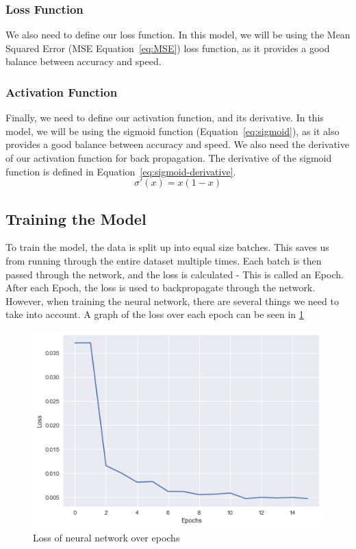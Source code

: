 \documentclass[titlepage]{article}
\begin{document}
\subsubsection{Loss Function}
We also need to define our loss function. In this model, we will be using the Mean Squared Error (MSE Equation~\ref{eq:MSE}) loss function, as it provides a good balance between accuracy and speed.
\subsubsection{Activation Function}
Finally, we need to define our activation function, and its derivative. In this model, we will be using the sigmoid function (Equation~\ref{eq:sigmoid}), as it also provides a good balance between accuracy and speed. We also need the derivative of our activation function for back propagation. The derivative of the sigmoid function is defined in Equation~\ref{eq:sigmoid-derivative}.
\begin{equation}
    \sigma'(x) = x(1-x)
    \label{eq:sigmoid-derivative}
\end{equation}


\subsection{Training the Model}
To train the model, the data is split up into equal size batches. This saves us from running through the entire dataset multiple times. Each batch is then passed through the network, and the loss is calculated - This is called an Epoch. After each Epoch, the loss is used to backpropagate through the network. However, when training the neural network, there are several things we need to take into account. A graph of the loss over each epoch can be seen in \ref{fig:loss}
\begin{figure}[h!]
    \includegraphics[width=\linewidth]{assets/loss.png}
    \caption{Loss of neural network over epochs}
    \label{fig:loss}
\end{figure}
\end{document}
